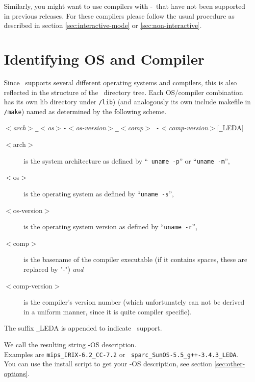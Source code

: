 Similarly, you might want to use compilers with \cgal-\cgalrelease\ 
that have not been supported in previous releases. For these compilers
please follow the usual procedure as described in section
\ref{sec:interactive-mode} or \ref{sec:non-interactive}.

\section{Identifying OS and Compiler}\label{sec:os-compiler-id}

Since \cgal\ supports several different operating systems and
compilers, this is also reflected in the structure of the \cgal\ 
directory tree. Each OS/compiler combination has its own lib directory
under \texttt{\cgaldir/lib}) (and analogously its own include
makefile\index{include makefile} in \texttt{\cgaldir/make}) named as
determined by the following scheme.
\begin{center}
  \textit{$<$arch$>$\texttt{\_}$<$os$>$\texttt{-}$<$os-version$>$\texttt{\_}$<$comp$>${\tt
    -}$<$comp-version$>$}[\texttt{\_}LEDA]
\end{center}

\begin{description}
\item[$<$arch$>$] is the system architecture as defined by ``{\tt
    uname -p}'' or ``\texttt{uname -m}'',
\item[$<$os$>$] is the operating system as defined by ``\texttt{uname
    -s}'',
\item[$<$os-version$>$] is the operating system version as defined by
  ``\texttt{uname -r}'',
\item[$<$comp$>$] is the basename of the compiler executable (if it
  contains spaces, these are replaced by "-") \textit{and}
\item[$<$comp-version$>$] is the compiler's version number (which
  unfortunately can not be derived in a uniform manner, since it is
  quite compiler specific).
\end{description}

The suffix \texttt{\_}LEDA is appended to indicate \leda\ support. 

We call the resulting string \cgal-OS description.\\ Examples are
\texttt{mips\_IRIX-6.2\_CC-7.2} or {\tt
  sparc\_SunOS-5.5\_g++-3.4.3\_LEDA}.\\ You can use the install script
to get your \cgal-OS description, see section \ref{sec:other-options}.

